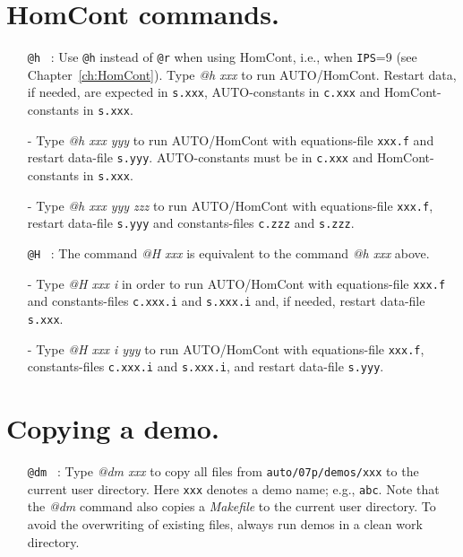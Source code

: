 \documentclass[12pt]{report}
\begin{document}
\section{ HomCont commands.} 

\begin{itemize}
\item[\tt @h]~:
  Use {\tt @h} instead of {\tt @r} when using {\cal HomCont}, i.e., when {\tt IPS}=9
  (see Chapter~\ref{ch:HomCont}).
  Type {\it @h xxx} to run {\cal AUTO}/{\cal HomCont}.
  Restart data, if needed, are expected in {\tt s.xxx},
  {\cal AUTO}-constants in {\tt c.xxx} and {\cal HomCont}-constants in {\tt s.xxx}.
\item[-]
  Type {\it @h xxx yyy} to run {\cal AUTO}/{\cal HomCont}
  with equations-file {\tt xxx.f} and restart data-file {\tt s.yyy}.
  {\cal AUTO}-constants must be in {\tt c.xxx} and {\cal HomCont}-constants in {\tt s.xxx}.
\item[-]
  Type {\it @h xxx yyy zzz} to run {\cal AUTO}/{\cal HomCont}
  with equations-file {\tt xxx.f}, restart data-file {\tt s.yyy}
  and constants-files {\tt c.zzz} and {\tt s.zzz}.

\item[\tt @H]~:
  The command {\it @H xxx} is equivalent to the command {\it @h xxx} above.
\item[-]
  Type {\it @H xxx i} in order to run {\cal AUTO}/{\cal HomCont} with equations-file {\tt xxx.f}
  and constants-files {\tt c.xxx.i} and {\tt s.xxx.i}
  and, if needed, restart data-file {\tt s.xxx}. 
\item[-]
  Type {\it @H xxx i yyy} to run {\cal AUTO}/{\cal HomCont}
  with equations-file {\tt xxx.f}, 
  constants-files {\tt c.xxx.i} and {\tt s.xxx.i},
  and restart data-file {\tt s.yyy}.
\end{itemize}

\section{ Copying a demo.} 

\begin{itemize}

\item[\tt @dm]~:
  Type {\it @dm xxx} 
  to copy all files 
  from {\tt auto/07p/demos/xxx}
  to the current user directory.
  Here {\tt xxx} denotes a demo name; e.g., {\tt abc}.
  Note that the {\it @dm} command also copies a {\it Makefile}
  to the current user directory. To avoid the overwriting of
  existing files, always run demos in a clean work directory.
\end{itemize}
\end{document}

